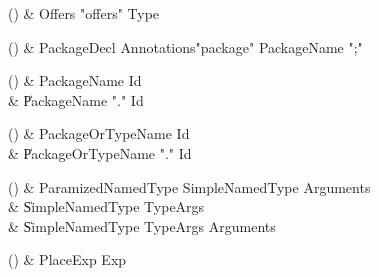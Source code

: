 \begin{bbgrammarappendix}

() & Offers \label{prod:Offers}  \: \xcd"offers" Type  \\


\end{bbgrammarappendix}

\begin{bbgrammarappendix}

() & PackageDecl \label{prod:PackageDecl}  \: Annotations\opt \xcd"package" PackageName \xcd";"  \\


\end{bbgrammarappendix}

\begin{bbgrammarappendix}

() & PackageName \label{prod:PackageName}  \: Id  \\

 &    \| PackageName \xcd"." Id \\

\end{bbgrammarappendix}

\begin{bbgrammarappendix}

() & PackageOrTypeName \label{prod:PackageOrTypeName}  \: Id  \\

 &    \| PackageOrTypeName \xcd"." Id \\

\end{bbgrammarappendix}

\begin{bbgrammarappendix}

() & ParamizedNamedType \label{prod:ParamizedNamedType}  \: SimpleNamedType Arguments  \\

 &    \| SimpleNamedType TypeArgs \\
 &    \| SimpleNamedType TypeArgs Arguments \\

\end{bbgrammarappendix}

\begin{bbgrammarappendix}

() & PlaceExp \label{prod:PlaceExp}  \: Exp  \\


\end{bbgrammarappendix}

